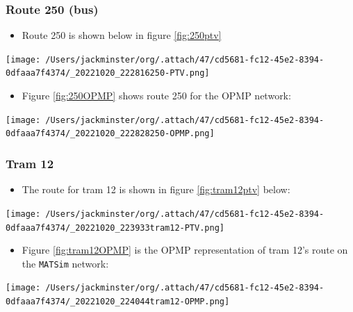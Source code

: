 \documentclass[11pt]{article}
\begin{document}
\subsubsection{Route 250 (bus)}
\label{sec:org2f01a15}
\begin{itemize}
\item Route 250 is shown below in figure \ref{fig:250ptv}
\end{itemize}

\begin{center}
\texttt{[image: /Users/jackminster/org/.attach/47/cd5681-fc12-45e2-8394-0dfaaa7f4374/\_20221020\_222816250-PTV.png]}
\end{center}


\begin{itemize}
\item Figure \ref{fig:250OPMP}  shows route 250 for the OPMP network:
\end{itemize}

\begin{center}
\texttt{[image: /Users/jackminster/org/.attach/47/cd5681-fc12-45e2-8394-0dfaaa7f4374/\_20221020\_222828250-OPMP.png]}
\end{center}
\subsubsection{Tram 12}
\label{sec:orge5acf11}
\begin{itemize}
\item The route for tram 12 is shown in figure \ref{fig:tram12ptv} below:
\end{itemize}

\begin{center}
\texttt{[image: /Users/jackminster/org/.attach/47/cd5681-fc12-45e2-8394-0dfaaa7f4374/\_20221020\_223933tram12-PTV.png]}
\end{center}

\begin{itemize}
\item Figure \ref{fig:tram12OPMP} is the OPMP representation of tram 12's route on the \texttt{MATSim} network:
\end{itemize}

\begin{center}
\texttt{[image: /Users/jackminster/org/.attach/47/cd5681-fc12-45e2-8394-0dfaaa7f4374/\_20221020\_224044tram12-OPMP.png]}
\end{center}
\end{document}
